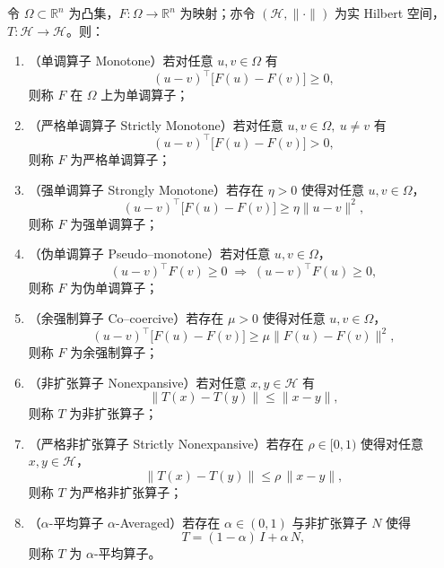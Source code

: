\begin{definition}[算子类型]\label{def:operator-types}
	令 $\Omega\subset\mathbb R^n$ 为凸集，$F:\Omega\to\mathbb R^n$ 为映射；亦令 $(\mathcal{H},\|\cdot\|)$ 为实 Hilbert 空间，$T:\mathcal{H}\to\mathcal{H}$。则：
	
	\begin{enumerate}
		\item （单调算子 Monotone）若对任意 $u,v\in\Omega$ 有
		\[
		(u-v)^\top\bigl[F(u)-F(v)\bigr]\ge0,
		\]
		则称 $F$ 在 $\Omega$ 上为单调算子；
		
		\item （严格单调算子 Strictly Monotone）若对任意 $u,v\in\Omega,\ u\neq v$ 有
		\[
		(u-v)^\top\bigl[F(u)-F(v)\bigr]>0,
		\]
		则称 $F$ 为严格单调算子；
		
		\item （强单调算子 Strongly Monotone）若存在 $\eta>0$ 使得对任意 $u,v\in\Omega$，
		\[
		(u-v)^\top\bigl[F(u)-F(v)\bigr]\ge \eta\|u-v\|^2,
		\]
		则称 $F$ 为强单调算子；
		
		\item （伪单调算子 Pseudo–monotone）若对任意 $u,v\in\Omega$，
		\[
		(u-v)^\top F(v)\ge0
		\;\Longrightarrow\;
		(u-v)^\top F(u)\ge0,
		\]
		则称 $F$ 为伪单调算子；
		
		\item （余强制算子 Co–coercive）若存在 $\mu>0$ 使得对任意 $u,v\in\Omega$，
		\[
		(u-v)^\top\bigl[F(u)-F(v)\bigr]\ge \mu\|F(u)-F(v)\|^2,
		\]
		则称 $F$ 为余强制算子；
		
		\item （非扩张算子 Nonexpansive）若对任意 $x,y\in\mathcal{H}$ 有
		\[
		\|T(x)-T(y)\|\le \|x-y\|,
		\]
		则称 $T$ 为非扩张算子；
		
		\item （严格非扩张算子 Strictly Nonexpansive）若存在 $\rho\in[0,1)$ 使得对任意 $x,y\in\mathcal{H}$，
		\[
		\|T(x)-T(y)\|\le \rho\,\|x-y\|,
		\]
		则称 $T$ 为严格非扩张算子；
		
		\item （$\alpha$-平均算子 $\alpha$-Averaged）若存在 $\alpha\in(0,1)$ 与非扩张算子 $N$ 使得
		\[
		T = (1-\alpha)\,I + \alpha\,N,
		\]
		则称 $T$ 为 $\alpha$-平均算子。
	\end{enumerate}
\end{definition}
\newpage
